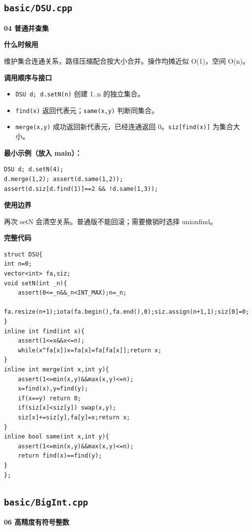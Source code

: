 \documentclass[UTF8,a4paper,10pt]{ctexart}
\newcommand{\TemplUsage}[1]{\textbf{什么时候用}\par #1\par}
\newcommand{\TemplApi}[1]{\textbf{调用顺序与接口}\par #1\par}
\newcommand{\TemplNote}[1]{\textbf{使用边界}\par #1\par}
\begin{document}
\subsection{\texttt{basic/DSU.cpp}}
\textbf{04 普通并查集}

\TemplUsage{维护集合连通关系，路径压缩配合按大小合并。操作均摊近似 O(1)，空间 O(n)。}
\TemplApi{\begin{itemize}
\item \texttt{DSU d; d.setN(n)} 创建 1..n 的独立集合。
\item \texttt{find(x)} 返回代表元；\texttt{same(x,y)} 判断同集合。
\item \texttt{merge(x,y)} 成功返回新代表元，已经连通返回 0。\texttt{siz[find(x)]} 为集合大小。
\end{itemize}}
\textbf{最小示例（放入 main）：}
\begin{lstlisting}
DSU d; d.setN(4);
d.merge(1,2); assert(d.same(1,2));
assert(d.siz[d.find(1)]==2 && !d.same(1,3));
\end{lstlisting}
\TemplNote{再次 setN 会清空关系。普通版不能回滚；需要撤销时选择 unionfind。}
\textbf{完整代码}
\begin{lstlisting}[firstnumber=1]
struct DSU{
int n=0;
vector<int> fa,siz;
void setN(int _n){
	assert(0<=_n&&_n<INT_MAX);n=_n;
	fa.resize(n+1);iota(fa.begin(),fa.end(),0);siz.assign(n+1,1);siz[0]=0;
}
inline int find(int x){
	assert(1<=x&&x<=n);
	while(x^fa[x])x=fa[x]=fa[fa[x]];return x;
}
inline int merge(int x,int y){
	assert(1<=min(x,y)&&max(x,y)<=n);
	x=find(x),y=find(y);
	if(x==y) return 0;
	if(siz[x]<siz[y]) swap(x,y);
	siz[x]+=siz[y],fa[y]=x;return x;
}
inline bool same(int x,int y){
	assert(1<=min(x,y)&&max(x,y)<=n);
	return find(x)==find(y);
}
};
\end{lstlisting}
\par\vspace{1em}
\subsection{\texttt{basic/BigInt.cpp}}
\textbf{06 高精度有符号整数}
\end{document}

